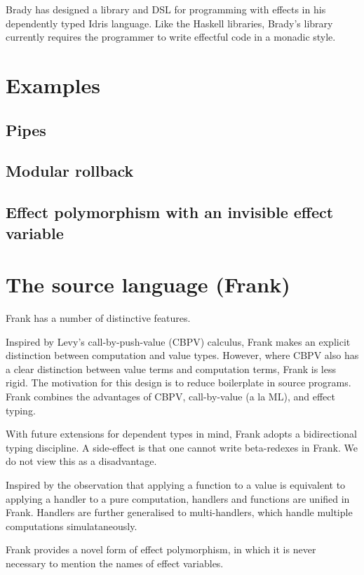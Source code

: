 \documentclass[preprint]{sigplanconf}
\begin{document}
Brady has designed a library and DSL for programming with effects in
his dependently typed Idris language. Like the Haskell libraries,
Brady's library currently requires the programmer to write effectful
code in a monadic style.


\section{Examples}

\subsection{Pipes}

\subsection{Modular rollback}

\subsection{Effect polymorphism with an invisible effect variable}


\section{The source language (Frank)}

Frank has a number of distinctive features.

Inspired by Levy's call-by-push-value (CBPV) calculus, Frank makes an
explicit distinction between computation and value types. However,
where CBPV also has a clear distinction between value terms and
computation terms, Frank is less rigid. The motivation for this design
is to reduce boilerplate in source programs. Frank combines the
advantages of CBPV, call-by-value (a la ML), and effect typing.

With future extensions for dependent types in mind, Frank adopts a
bidirectional typing discipline. A side-effect is that one cannot
write beta-redexes in Frank. We do not view this as a disadvantage.

Inspired by the observation that applying a function to a value is
equivalent to applying a handler to a pure computation, handlers and
functions are unified in Frank. Handlers are further generalised to
multi-handlers, which handle multiple computations simulataneously.

Frank provides a novel form of effect polymorphism, in which it is
never necessary to mention the names of effect variables.
\end{document}
